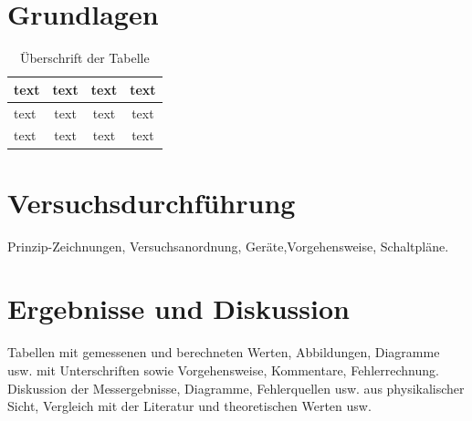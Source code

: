\documentclass[a4paper,twoside,final]{article}
\begin{document}
\section{Grundlagen} \label{sec:Grundlagen}




\begin{table}[ht]
	\centering
	\caption{Überschrift der Tabelle}
	\label{tab:Tabelle1}
	\begin{tabular}{l c c c}
		\toprule
	    text & text & text & text\\
	 	\midrule
			text & text & text & text\\
			text & text & text & text
	\end{tabular}
\end{table}

\section{Versuchsdurchführung} \label{sec:Versuchsdurchführung}
Prinzip-Zeichnungen, Versuchsanordnung, Geräte,Vorgehensweise, Schaltpläne.


\section{Ergebnisse und Diskussion}
Tabellen mit gemessenen und berechneten Werten, Abbildungen, Diagramme usw. mit Unterschriften sowie Vorgehensweise, Kommentare, Fehlerrechnung.\\
Diskussion der Messergebnisse, Diagramme, Fehlerquellen usw. aus physikalischer Sicht, Vergleich mit der Literatur und theoretischen Werten usw.
\end{document}
